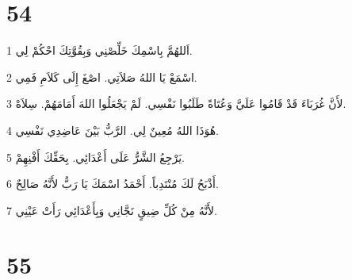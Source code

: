 \chapter{54}

\par 1 اَللهُمَّ بِاسْمِكَ خَلِّصْنِي وَبِقُوَّتِكَ احْكُمْ لِي.
\par 2 اسْمَعْ يَا اللهُ صَلاَتِي. اصْغَ إِلَى كَلاَمِ فَمِي.
\par 3 لأَنَّ غُرَبَاءَ قَدْ قَامُوا عَلَيَّ وَعُتَاةً طَلَبُوا نَفْسِي. لَمْ يَجْعَلُوا اللهَ أَمَامَهُمْ. سِلاَهْ.
\par 4 هُوَذَا اللهُ مُعِينٌ لِي. الرَّبُّ بَيْنَ عَاضِدِي نَفْسِي.
\par 5 يَرْجِعُ الشَّرُّ عَلَى أَعْدَائِي. بِحَقِّكَ أَفْنِهِمْ.
\par 6 أَذْبَحُ لَكَ مُنْتَدِباً. أَحْمَدُ اسْمَكَ يَا رَبُّ لأَنَّهُ صَالِحٌ.
\par 7 لأَنَّهُ مِنْ كُلِّ ضِيقٍ نَجَّانِي وَبِأَعْدَائِي رَأَتْ عَيْنِي.

\chapter{55}

